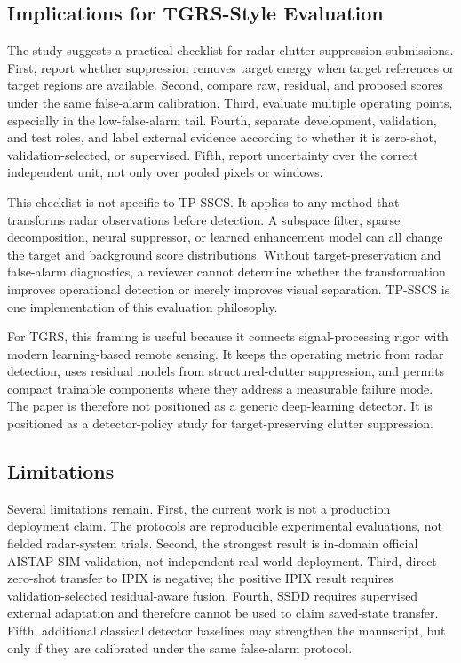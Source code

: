 \documentclass[journal]{IEEEtran}
\begin{document}
\subsection{Implications for TGRS-Style Evaluation}

The study suggests a practical checklist for radar clutter-suppression submissions. First, report whether suppression removes target energy when target references or target regions are available. Second, compare raw, residual, and proposed scores under the same false-alarm calibration. Third, evaluate multiple operating points, especially in the low-false-alarm tail. Fourth, separate development, validation, and test roles, and label external evidence according to whether it is zero-shot, validation-selected, or supervised. Fifth, report uncertainty over the correct independent unit, not only over pooled pixels or windows.

This checklist is not specific to TP-SSCS. It applies to any method that transforms radar observations before detection. A subspace filter, sparse decomposition, neural suppressor, or learned enhancement model can all change the target and background score distributions. Without target-preservation and false-alarm diagnostics, a reviewer cannot determine whether the transformation improves operational detection or merely improves visual separation. TP-SSCS is one implementation of this evaluation philosophy.

For TGRS, this framing is useful because it connects signal-processing rigor with modern learning-based remote sensing. It keeps the operating metric from radar detection, uses residual models from structured-clutter suppression, and permits compact trainable components where they address a measurable failure mode. The paper is therefore not positioned as a generic deep-learning detector. It is positioned as a detector-policy study for target-preserving clutter suppression.

\subsection{Limitations}

Several limitations remain. First, the current work is not a production deployment claim. The protocols are reproducible experimental evaluations, not fielded radar-system trials. Second, the strongest result is in-domain official AISTAP-SIM validation, not independent real-world deployment. Third, direct zero-shot transfer to IPIX is negative; the positive IPIX result requires validation-selected residual-aware fusion. Fourth, SSDD requires supervised external adaptation and therefore cannot be used to claim saved-state transfer. Fifth, additional classical detector baselines may strengthen the manuscript, but only if they are calibrated under the same false-alarm protocol.
\end{document}
